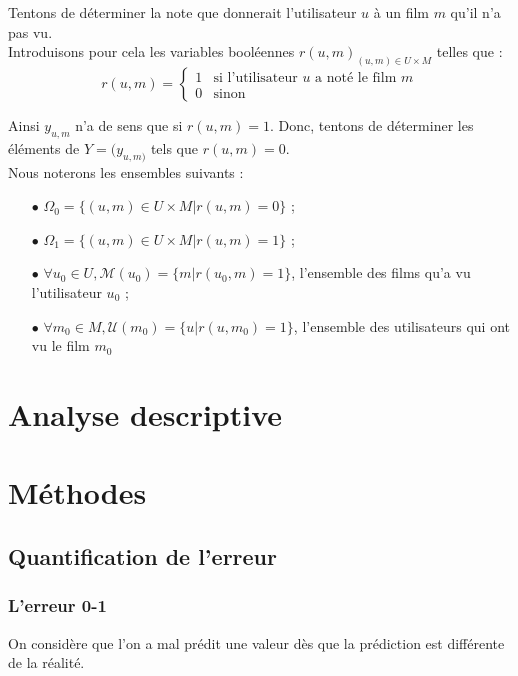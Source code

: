 \documentclass[a4paper, 11pt]{book}
\begin{document}
Tentons de déterminer la note que donnerait l'utilisateur $u$ à un film $m$ qu'il n'a pas vu. \\
Introduisons pour cela les variables booléennes $r(u,m)_{(u, m) \in U \times M}$ telles que :\\
$$r(u,m) = 
\left\{
\begin{array}{ll}
1 & \text{si l'utilisateur } u \text{ a noté le film } m \\
0  & \text{sinon} \
\end{array}
\right.$$
\medskip 

Ainsi $y_{u,m}$ n'a de sens que si $r(u,m) =1$. Donc, tentons de déterminer les éléments de $Y=(y_{u,m)}$ tels que $r(u,m)=0$. \\

Nous noterons les ensembles suivants : 
\begin{itemize}
\item[$\bullet$]  $\Omega_0 = \{(u,m) \in U \times M | r(u,m) = 0 \}$ ;
\item[$\bullet$]  $\Omega_1 = \{(u,m) \in U \times M | r(u,m) = 1\}$ ;
\item[$\bullet$]  $\forall u_0 \in U, \mathcal{M}(u_0) = \{m | r(u_0,m) = 1 \}$, l'ensemble des films qu'a vu l'utilisateur $u_0$ ;
\item[$\bullet$]  $\forall m_0 \in M, \mathcal{U}(m_0) = \{u | r(u,m_0) = 1 \}$, l'ensemble des utilisateurs qui ont vu le film $m_0$
\end{itemize}

\chapter{Analyse descriptive}

\chapter{Méthodes}

\section{Quantification de l'erreur}

\subsection{L'erreur 0-1}

On considère que l'on a mal prédit une valeur dès que la prédiction est différente de la réalité.
\end{document}
